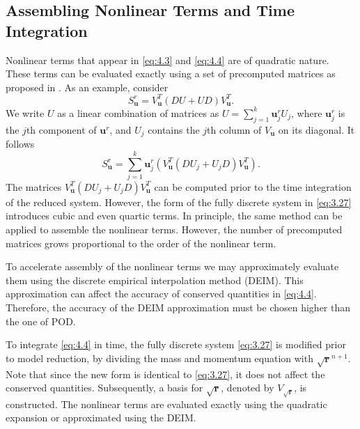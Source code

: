 \subsection{Assembling Nonlinear Terms and Time Integration}
Nonlinear terms that appear in \eqref{eq:4.3} and \eqref{eq:4.4} are of quadratic nature. These terms can be evaluated exactly using a set of precomputed matrices as proposed in \cite{Benner2018}. As an example, consider
\begin{equation}
	S_{\mathbf u}^r = V^T_{\mathbf u} ( DU + UD ) V^T_{\mathbf u}.
\end{equation}
We write $U$ as a linear combination of matrices as $U = \sum_{j=1}^k \mathbf u ^r_j U_j$, where $\mathbf u ^r_j$ is the $j$th component of $\mathbf u ^r$, and $U_j$ contains the $j$th column of $V_{\mathbf u}$ on its diagonal. It follows
\begin{equation}
	S_{\mathbf u}^r = \sum_{j=1}^k \mathbf u ^r_j \left( V^T_{\mathbf u} ( DU_j + U_jD ) V^T_{\mathbf u} \right).
\end{equation}
The matrices $V^T_{\mathbf u} ( DU_j + U_jD ) V^T_{\mathbf u}$ can be computed prior to the time integration of the reduced system. However, the form of the fully discrete system in \eqref{eq:3.27} introduces cubic and even quartic terms. In principle, the same method can be applied to assemble the nonlinear terms. However, the number of precomputed matrices grows proportional to the order of the nonlinear term. 

To accelerate assembly of the nonlinear terms we may approximately evaluate them using the discrete empirical interpolation method (DEIM). This approximation can affect the accuracy of conserved quantities in \eqref{eq:4.4}. Therefore, the accuracy of the DEIM approximation must be chosen higher than the one of POD.

To integrate \eqref{eq:4.4} in time, the fully discrete system \eqref{eq:3.27} is modified prior to model reduction, by dividing the mass and momentum equation with $\sqrt{\mathbf r}^{n+1}$. Note that since the new form is identical to \eqref{eq:3.27}, it does not affect the conserved quantities. Subsequently, a basis for $\sqrt{\mathbf r}$, denoted by $V_{\sqrt{\mathbf r}}$, is constructed. The nonlinear terms are evaluated exactly using the quadratic expansion or approximated using the DEIM.
